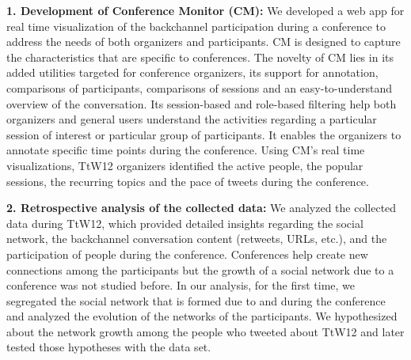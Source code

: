 \documentclass[conference,final]{IEEEtran}
\begin{document}
\textbf{1. Development of Conference Monitor (CM):} We developed a web app for real time visualization of the backchannel participation during a conference to address the needs of both organizers and participants. CM is designed to capture the characteristics that are specific to conferences. The novelty of CM lies in its added utilities targeted for conference organizers, its support for annotation, comparisons of participants, comparisons of sessions and an easy-to-understand overview of the conversation. Its session-based and role-based filtering help both organizers and general users understand the activities regarding a particular session of interest or particular group of participants. It enables the organizers to annotate specific time points during the conference. Using CM's real time visualizations, TtW12 organizers identified the active people, the popular sessions, the recurring topics and the pace of tweets during the conference. 

\textbf{2. Retrospective analysis of the collected data:} We analyzed the collected data during TtW12, which provided detailed insights regarding the social network, the backchannel conversation content (retweets, URLs, etc.), and the participation of people during the conference. Conferences help create new connections among the participants but the growth of a social network due to a conference was not studied before. In our analysis, for the first time, we segregated the social network that is formed due to and during the conference and analyzed the evolution of the networks of the participants. We hypothesized about the network growth among the people who tweeted about TtW12 and later tested those hypotheses with the data set. 

\end{document}
